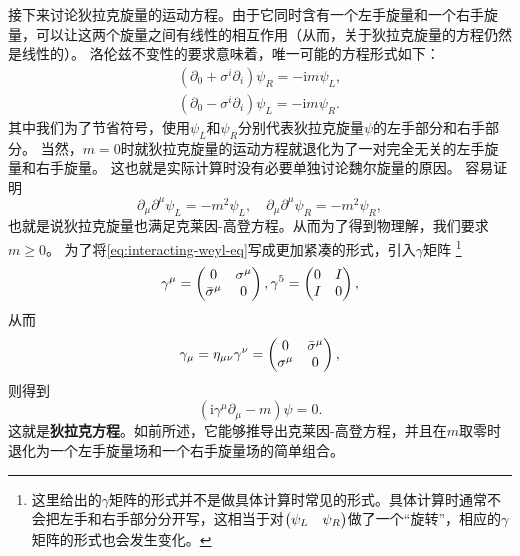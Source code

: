 \documentclass[hyperref, UTF8, a4paper]{ctexart}
\newcommand*{\ii}{\mathrm{i}}
\begin{document}
接下来讨论狄拉克旋量的运动方程。由于它同时含有一个左手旋量和一个右手旋量，可以让这两个旋量之间有线性的相互作用（从而，关于狄拉克旋量的方程仍然是线性的）。
洛伦兹不变性的要求意味着，唯一可能的方程形式如下：
\begin{equation}
    \begin{aligned}
        (\partial_0 + \sigma^i \partial_i) \psi_R = - \ii m \psi_L, \\
        (\partial_0 - \sigma^i \partial_i) \psi_L = - \ii m \psi_R.
    \end{aligned}
    \label{eq:interacting-weyl-eq}
\end{equation}
其中我们为了节省符号，使用$\psi_L$和$\psi_R$分别代表狄拉克旋量$\psi$的左手部分和右手部分。
当然，$m=0$时就狄拉克旋量的运动方程就退化为了一对完全无关的左手旋量和右手旋量。
这也就是实际计算时没有必要单独讨论魏尔旋量的原因。
容易证明
\[
    \partial_\mu \partial^\mu \psi_L = - m^2 \psi_L, \quad \partial_\mu \partial^\mu \psi_R = - m^2 \psi_R,
\]
也就是说狄拉克旋量也满足克莱因-高登方程。从而为了得到物理解，我们要求$m \geq 0$。
为了将\eqref{eq:interacting-weyl-eq}写成更加紧凑的形式，引入$\gamma$矩阵%
\footnote{这里给出的$\gamma$矩阵的形式并不是做具体计算时常见的形式。具体计算时通常不会把左手和右手部分分开写，这相当于对$\pmqty{\psi_L & \psi_R}$做了一个“旋转”，相应的$\gamma$矩阵的形式也会发生变化。}
\begin{equation}
    \gamma^\mu = \pmqty{0 & \sigma^\mu \\ \bar{\sigma}^\mu & 0}, \gamma^5 = \pmqty{0 & I \\ I & 0},
    \label{eq:gamma-matrix}
\end{equation}
从而
\begin{equation}
    \gamma_\mu = \eta_{\mu \nu} \gamma^\nu = \pmqty{ 0 & \bar{\sigma}^\mu \\ \sigma^\mu & 0 },
\end{equation}
则得到
\begin{equation}
    (\ii \gamma^\mu \partial_\mu - m) \psi = 0.
    \label{eq:dirac-eq}
\end{equation}
这就是\textbf{狄拉克方程}。如前所述，它能够推导出克莱因-高登方程，并且在$m$取零时退化为一个左手旋量场和一个右手旋量场的简单组合。
\end{document}

